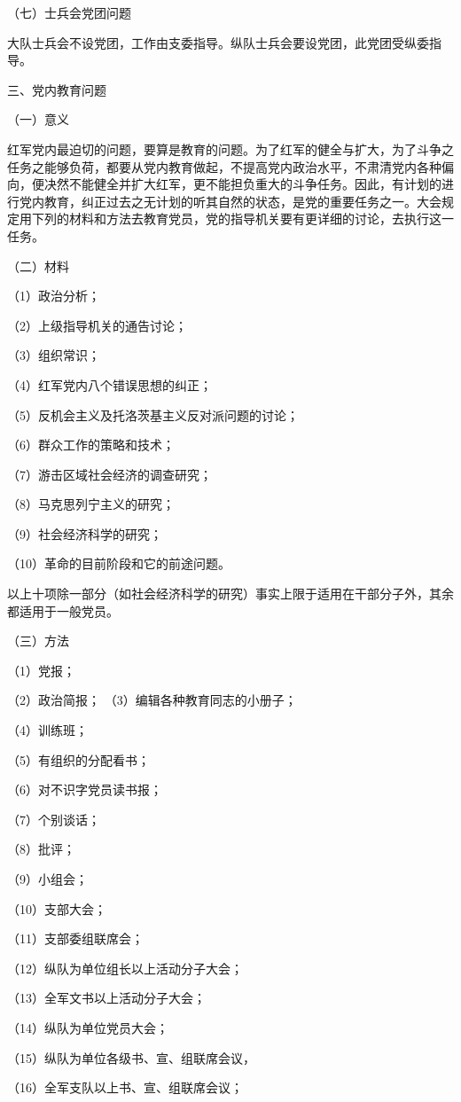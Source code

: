 （七）士兵会党团问题

大队士兵会不设党团，工作由支委指导。纵队士兵会要设党团，此党团受纵委指导。

三、党内教育问题

（一）意义

红军党内最迫切的问题，要算是教育的问题。为了红军的健全与扩大，为了斗争之任务之能够负荷，都要从党内教育做起，不提高党内政治水平，不肃清党内各种偏向，便决然不能健全并扩大红军，更不能担负重大的斗争任务。因此，有计划的进行党内教育，纠正过去之无计划的听其自然的状态，是党的重要任务之一。大会规定用下列的材料和方法去教育党员，党的指导机关要有更详细的讨论，去执行这一任务。

（二）材料

（1）政治分析；

（2）上级指导机关的通告讨论；

（3）组织常识；

（4）红军党内八个错误思想的纠正；

（5）反机会主义及托洛茨基主义反对派问题的讨论；

（6）群众工作的策略和技术；

（7）游击区域社会经济的调查研究；

（8）马克思列宁主义的研究；

（9）社会经济科学的研究；

（10）革命的目前阶段和它的前途问题。

以上十项除一部分（如社会经济科学的研究）事实上限于适用在干部分子外，其余都适用于一般党员。


（三）方法

（1）党报；

（2）政治简报； 
（3）编辑各种教育同志的小册子；

（4）训练班；

（5）有组织的分配看书；

（6）对不识字党员读书报；

（7）个别谈话；

（8）批评；

（9）小组会；

（10）支部大会；

（11）支部委组联席会；

（12）纵队为单位组长以上活动分子大会；

（13）全军文书以上活动分子大会；

（14）纵队为单位党员大会；

（15）纵队为单位各级书、宣、组联席会议，

（16）全军支队以上书、宣、组联席会议；

